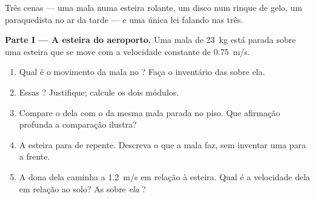 \begin{problem}
\label{pb:g10:inertia:1}
Três cenas --- uma mala numa esteira rolante, um disco num rinque de
gelo, um paraquedista no ar da tarde --- e uma única lei falando nas
três.

\medskip
\noindent\textbf{Parte I --- A esteira do aeroporto.}
Uma mala de \qty{23}{kg} está parada sobre uma esteira que se move com a
velocidade constante de \qty{0.75}{m/s}.
\begin{enumerate}
  \item Qual é o movimento da mala no ? Faça o
        inventário das  sobre ela.
  \item Essas  ? Justifique; calcule os dois módulos.
  \item Compare o  dela com o da mesma mala parada no
        piso. Que afirmação profunda a comparação ilustra?
  \item A esteira para de repente. Descreva o que a mala faz, sem
        inventar uma  para a frente.
  \item A dona dela caminha a \qty{1.2}{m/s} em relação à esteira. Qual é
        a velocidade dela em relação ao solo? As  sobre \emph{ela}
        ?
\end{enumerate}


\end{problem}
